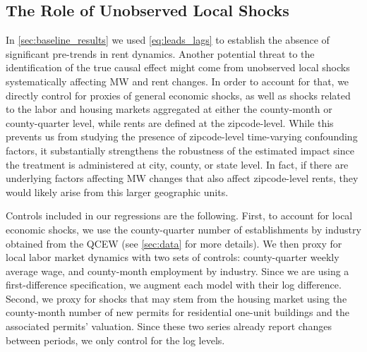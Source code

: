 \subsection{The Role of Unobserved Local Shocks}\label{sec:econ_shocks}

In \autoref{sec:baseline_results} we used \autoref{eq:leads_lags} to establish the absence of 
significant pre-trends in rent dynamics. Another potential threat to the identification of the true 
causal effect might come from unobserved local shocks systematically affecting MW and rent changes. 
In order to account for that, we directly control for proxies of general economic shocks, as well as 
shocks related to the labor and housing markets aggregated at either the county-month or 
county-quarter level, while rents are defined at the zipcode-level. While this prevents us from 
studying the presence of zipcode-level time-varying confounding factors, it substantially strengthens 
the robustness of the estimated impact since the treatment is administered at city, county, or state 
level. In fact, if there are underlying factors affecting MW changes that also affect zipcode-level 
rents, they would likely arise from this larger geographic units.

Controls included in our regressions are the following. First, to account for local economic shocks, 
we use the county-quarter number of establishments by industry obtained from the QCEW (see 
\autoref{sec:data} for more details). We then proxy for local labor market dynamics with two sets 
of controls: county-quarter weekly average wage, and county-month employment by industry. Since we 
are using a first-difference specification, we augment each model with their log difference. Second, 
we proxy for shocks that may stem from the housing market using the county-month number of new 
permits for residential one-unit buildings and the associated permits' valuation. Since these two 
series already report changes between periods, we only control for the log levels.

